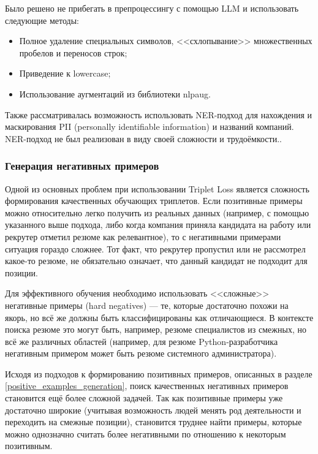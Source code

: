 \documentclass[14pt]{mmcs_article}
\begin{document}
Было решено не прибегать в препроцессингу с помощью LLM и использовать следующие методы:

\begin{itemize}
  \item Полное удаление специальных символов, <<схлопывание>> множественных пробелов и переносов строк;
  \item Приведение к lowercase;
  \item Использование аугментаций из библиотеки nlpaug\cite{ma2019nlpaug}.
\end{itemize}

Также рассматривалась возможность использовать NER-подход для нахождения и маскирования PII (personally identifiable information) и названий компаний. NER-подход не был реализован в виду своей сложности и трудоёмкости..

\subsubsection{Генерация негативных примеров}

Одной из основных проблем при использовании Triplet Loss является сложность формирования качественных обучающих триплетов. Если позитивные примеры можно относительно легко получить из реальных данных (например, с помощью указанного выше подхода, либо когда компания приняла кандидата на работу или рекрутер отметил резюме как релевантное), то с негативными примерами ситуация гораздо сложнее. Тот факт, что рекрутер пропустил или не рассмотрел какое-то резюме, не обязательно означает, что данный кандидат не подходит для позиции.

Для эффективного обучения необходимо использовать <<сложные>> негативные примеры (hard negatives)\cite{xuan2021hardnegativeexampleshard} --- те, которые достаточно похожи на якорь, но всё же должны быть классифицированы как отличающиеся. В контексте поиска резюме это могут быть, например, резюме специалистов из смежных, но всё же различных областей (например, для резюме Python-разработчика негативным примером может быть резюме системного администратора).

Исходя из подходов к формированию позитивных примеров, описанных в разделе \ref{positive_examples_generation}, поиск качественных негативных примеров становится ещё более сложной задачей. Так как позитивные примеры уже достаточно широкие (учитывая возможность людей менять род деятельности и переходить на смежные позиции), становится труднее найти примеры, которые можно однозначно считать более негативными по отношению к некоторым позитивным.
\end{document}
